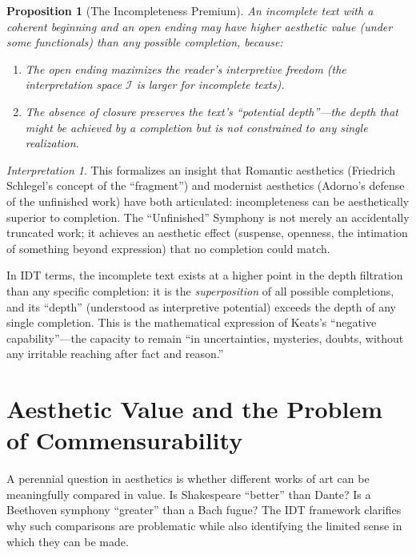 \documentclass[11pt,openany]{book}
\theoremstyle{definition}
\theoremstyle{plain}
\newtheorem{proposition}[axiom]{Proposition}
\theoremstyle{remark}
\newtheorem{interpretation}[axiom]{Interpretation}
\begin{document}
\begin{proposition}[The Incompleteness Premium]
An incomplete text with a coherent beginning and an open ending may have higher aesthetic value (under some functionals) than any possible completion, because:
\begin{enumerate}
\item The open ending maximizes the reader's interpretive freedom (the interpretation space $\mathcal{I}$ is larger for incomplete texts).
\item The absence of closure preserves the text's ``potential depth''---the depth that might be achieved by a completion but is not constrained to any single realization.
\end{enumerate}
\end{proposition}

\begin{interpretation}
This formalizes an insight that Romantic aesthetics (Friedrich Schlegel's concept of the ``fragment'') and modernist aesthetics (Adorno's defense of the unfinished work) have both articulated: incompleteness can be aesthetically superior to completion. The ``Unfinished'' Symphony is not merely an accidentally truncated work; it achieves an aesthetic effect (suspense, openness, the intimation of something beyond expression) that no completion could match.

In IDT terms, the incomplete text exists at a higher point in the depth filtration than any specific completion: it is the \emph{superposition} of all possible completions, and its ``depth'' (understood as interpretive potential) exceeds the depth of any single completion. This is the mathematical expression of Keats's ``negative capability''---the capacity to remain ``in uncertainties, mysteries, doubts, without any irritable reaching after fact and reason.''
\end{interpretation}

\section{Aesthetic Value and the Problem of Commensurability}

A perennial question in aesthetics is whether different works of art can be meaningfully compared in value. Is Shakespeare ``better'' than Dante? Is a Beethoven symphony ``greater'' than a Bach fugue? The IDT framework clarifies why such comparisons are problematic while also identifying the limited sense in which they can be made.
\end{document}
